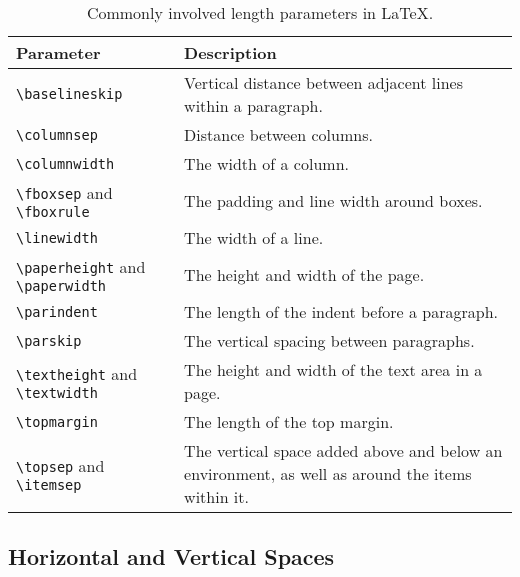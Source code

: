 \begin{table}[ht!]
\begin{tabularx}{\textwidth}{|p{}|X|}
\hline
Parameter & Description \\
\hline
\texttt{\textbackslash baselineskip} & Vertical distance between adjacent lines within a paragraph.  \\
\hline
\texttt{\textbackslash columnsep} & Distance between columns. \\
\hline
\texttt{\textbackslash columnwidth} & The width of a column. \\
\hline
\texttt{\textbackslash fboxsep} and \texttt{\textbackslash fboxrule} & The padding and line width around boxes. \\
\hline
\texttt{\textbackslash linewidth} & The width of a line. \\
\hline
\texttt{\textbackslash paperheight} and \texttt{\textbackslash paperwidth} & The height and width of the page. \\
\hline
\texttt{\textbackslash parindent} & The length of the indent before a paragraph. \\
\hline
\texttt{\textbackslash parskip} & The vertical spacing between paragraphs. \\
\hline
\texttt{\textbackslash textheight} and \texttt{\textbackslash textwidth} & The height and width of the text area in a page. \\
\hline
\texttt{\textbackslash topmargin} & The length of the top margin. \\
\hline
\texttt{\textbackslash topsep} and \texttt{\textbackslash itemsep} & The vertical space added above and below an environment, as well as around the items within it. \\
\hline
\end{tabularx}
\caption{Commonly involved length parameters in \LaTeX{}.}
\label{tab:lengthpmt}
\end{table}

\subsection{Horizontal and Vertical Spaces}

